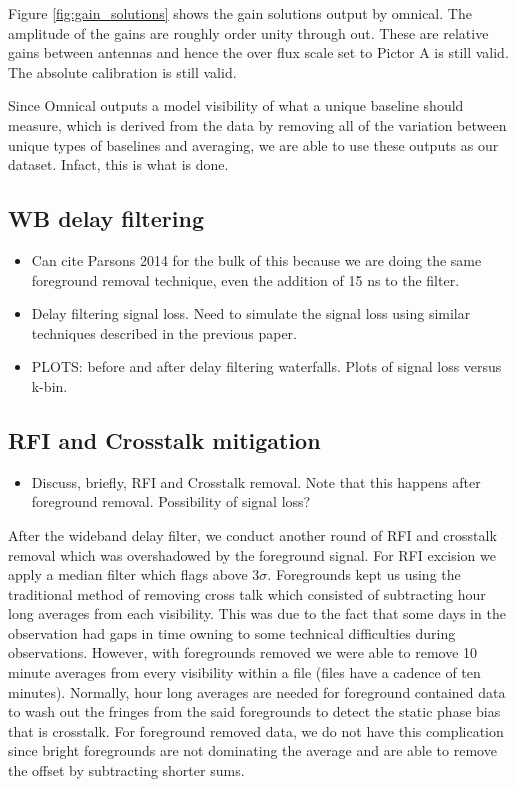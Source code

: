 \documentclass[twocolumn,numberedappendix]{emulateapj}
\begin{document}
Figure \ref{fig:gain_solutions} shows the gain solutions output by omnical. The
amplitude of the gains are roughly order unity through out. These are relative
gains between antennas and hence the over flux scale set to Pictor A is still
valid. The absolute calibration is still valid. 

Since Omnical outputs a model visibility of what a unique baseline should
measure, which is derived from the data by removing all of the variation between
unique types of baselines and averaging, we are able to use these outputs as our
dataset. Infact, this is what is done. 
%




\subsection{WB delay filtering}
\begin{itemize}
    \item{Can cite Parsons 2014 for the bulk of this because we are doing the
same foreground removal technique, even the addition of 15 ns to the filter.}
    \item{Delay filtering signal loss. Need to simulate the signal loss using
similar techniques described in the previous paper.}
    \item{PLOTS: before and after delay filtering waterfalls. Plots of signal
loss versus k-bin.}
\end{itemize}

\subsection{RFI and Crosstalk mitigation}
\begin{itemize}
    \item{Discuss, briefly, RFI and Crosstalk removal. Note that this happens
after foreground removal. Possibility of signal loss?}
\end{itemize}
After the wideband delay filter, we conduct another round of RFI and crosstalk
removal which was overshadowed by the foreground signal. For RFI excision we
apply a median filter which flags above $3\sigma$. Foregrounds kept us using the
traditional method of removing cross talk which consisted of subtracting hour
long averages from each visibility. This was due to the fact that some days in
the observation had gaps in time owning to some technical difficulties during
observations. However, with foregrounds removed we were able to remove 10 minute
averages from every visibility within a file (files have a cadence of ten
minutes). Normally, hour long averages are needed for foreground contained data
to wash out the fringes from the said foregrounds to detect the static phase
bias that is crosstalk. For foreground removed data, we do not have this
complication since bright foregrounds are not dominating the average and are
able to remove the offset by subtracting shorter sums.
\end{document}
